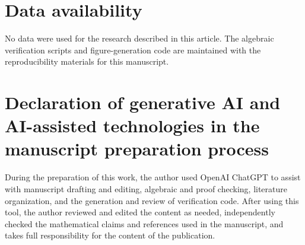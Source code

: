 \documentclass[11pt]{article}
\newcommand{\1}{\mathbf{1}}
\begin{document}
\section*{Data availability}
No data were used for the research described in this article. The algebraic verification scripts and figure-generation code are maintained with the reproducibility materials for this manuscript.

\section*{Declaration of generative AI and AI-assisted technologies in the manuscript preparation process}
During the preparation of this work, the author used OpenAI ChatGPT to assist with manuscript drafting and editing, algebraic and proof checking, literature organization, and the generation and review of verification code. After using this tool, the author reviewed and edited the content as needed, independently checked the mathematical claims and references used in the manuscript, and takes full responsibility for the content of the publication.


\end{document}
